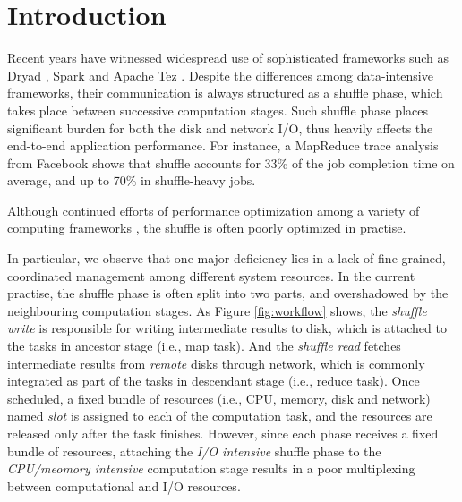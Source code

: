 \section{Introduction}
Recent years have witnessed widespread use of sophisticated frameworks such as Dryad \cite{dryad}, Spark \cite{spark} and Apache Tez \cite{tez}.
Despite the differences among data-intensive frameworks, their communication is always structured as a shuffle phase,  which takes place between successive computation stages. Such shuffle phase places significant burden for both the disk and network I/O, thus heavily affects the end-to-end application performance. For instance, a MapReduce trace analysis from Facebook shows that shuffle accounts for 33\% of the job completion time on average, and up to 70\% in shuffle-heavy jobs\cite{managing}.

Although continued efforts of performance optimization among a variety of computing frameworks \cite{babu, tachyon, pacman, quincy, delay}, the shuffle is often poorly optimized in practise.

In particular, we observe that one major deficiency lies in a lack of fine-grained, coordinated management among different system resources.
In the current practise, the shuffle phase is often split into two parts, and overshadowed by the neighbouring computation stages. As Figure \ref{fig:workflow} shows, the \textit{shuffle write} is responsible for writing intermediate results to disk, which is attached to the tasks in ancestor stage (i.e., map task).  And the \textit{shuffle read} fetches intermediate results from \emph{remote} disks through network, which is commonly integrated as part of the tasks in descendant stage (i.e., reduce task).  Once scheduled, a fixed bundle of resources (i.e., CPU, memory, disk and network) named \textit{slot} is assigned to each of the computation task, and the resources are released only after the task finishes.
However, since each phase receives a fixed bundle of resources, attaching the \emph{I/O intensive} shuffle phase to the \emph{CPU/meomory intensive} computation stage results in a poor multiplexing between computational and I/O resources.

